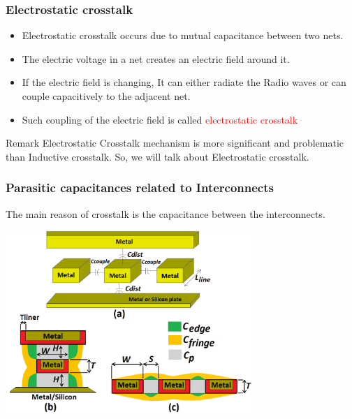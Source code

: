 \documentclass{beamer}
\begin{document}
	\begin{frame}
		\frametitle{Electrostatic crosstalk}
	\begin{itemize}
		\item Electrostatic crosstalk occurs due to mutual capacitance between two nets. 
		\item The electric voltage in a net creates an electric field around it. 
		\item If the electric field is changing, It can either radiate the Radio waves or can couple capacitively to the adjacent net. 
		\item Such coupling of the electric field is called \textcolor{red} {electrostatic crosstalk}
	\end{itemize}
		\begin{block}{Remark}
			Electrostatic Crosstalk mechanism is more significant and problematic than Inductive crosstalk. So, we will talk about Electrostatic crosstalk.
		\end{block}
	\end{frame}
	
	\begin{frame}
		\frametitle{Parasitic capacitances related to Interconnects}
		The main reason of crosstalk is the capacitance between the interconnects. \newline
		\begin{center}
				\includegraphics[width= 0.7\textwidth]{capacitance}
		\end{center}

	\end{frame}
\end{document}
